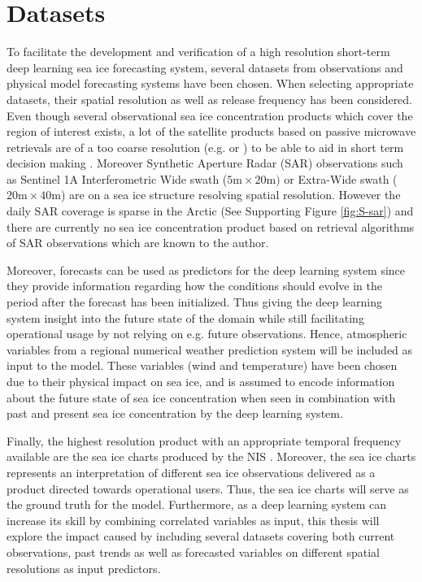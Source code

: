 \documentclass[../main/thesis.tex]{subfiles}
\begin{document}
\section{Datasets}
\label{sec:datasets}
To facilitate the development and verification of a high resolution short-term deep learning sea ice forecasting system, several datasets from observations and physical model forecasting systems have been chosen. When selecting appropriate datasets, their spatial resolution as well as release frequency has been considered. Even though several observational sea ice concentration products which cover the region of interest exists, a lot of the satellite products based on passive microwave retrievals are of a too coarse resolution (e.g. \citet{Lavergne2019} or \citet{Kern2019}) to be able to aid in short term decision making \citep{Wagner2020}. Moreover Synthetic Aperture Radar (SAR) observations such as Sentinel 1A Interferometric Wide swath ($5\text{m} \times 20\text{m})$ or Extra-Wide swath ($20\text{m} \times 40\text{m}$) are on a sea ice structure resolving spatial resolution. However the daily SAR coverage is sparse in the Arctic (See Supporting Figure \ref{fig:S-sar}) and there are currently no sea ice concentration product based on retrieval algorithms of SAR observations which are known to the author.

Moreover, forecasts can be used as predictors for the deep learning system since they provide information regarding how the conditions should evolve in the period after the forecast has been initialized. Thus giving the deep learning system insight into the future state of the domain while still facilitating operational usage by not relying on e.g. future observations. Hence, atmospheric variables from a regional numerical weather prediction system will be included as input to the model. These variables (wind and temperature) have been chosen due to their physical impact on sea ice, and is assumed to encode information about the future state of sea ice concentration when seen in combination with past and present sea ice concentration by the deep learning system.

Finally, the highest resolution product with an appropriate temporal frequency available are the sea ice charts produced by the NIS \citep{Dinessen2020}. Moreover, the sea ice charts represents an interpretation of different sea ice observations delivered as a product directed towards operational users. Thus, the sea ice charts will serve as the ground truth for the model. Furthermore, as a deep learning system can increase its skill by combining correlated variables as input, this thesis will explore the impact caused by including several datasets covering both current observations, past trends as well as forecasted variables on different spatial resolutions as input predictors.
\end{document}
